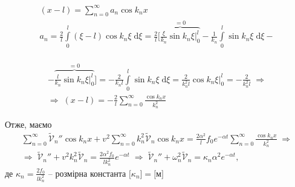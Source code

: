 \begin{equation*}
    \begin{gathered}
        (x-l) = \sum_{n=0}^\infty a_n \cos k_n x\\
        a_n = \frac{2}{l} \int\limits_0^l (\xi-l) \cos k_n\xi \;\mathrm{d}\xi =\frac{2}{l} \bigg[ \overbrace{\frac{\xi}{k_n} \sin k_n\xi \bigg|_0^l}^{=0} - \frac{1}{k_n} \int\limits_0^l \sin k_n\xi \;\mathrm{d}\xi -\\
    \end{gathered}
\end{equation*}

\begin{equation} \label{fourier-sum7,1}
    \begin{gathered}
        -\overbrace{\frac{l}{k_n}\sin k_n\xi \bigg|_0^l}^{=0}\bigg] = -\frac{2}{k_n l} \int\limits_0^l \sin k_n\xi \;\mathrm{d}\xi = \frac{2}{k_n^2 l} \cos k_n\xi \bigg|_0^l = -\frac{2}{k_n^2 l} 
        \;\Rightarrow \\
        \Rightarrow\; (x-l) = -\frac{2}{l}\sum_{n=0}^\infty \frac{\cos k_n x}{k_n^2}
    \end{gathered}
\end{equation}

Отже, маємо 
\begin{equation}
    \begin{gathered}
        \sum_{n=0}^\infty \widetilde{\mathcal{V}}_n'' \cos k_n x + v^2 \sum_{n=0}^\infty k_n^2 \widetilde{\mathcal{V}}_n \cos k_n x =  \frac{2 \alpha^2}{l} f_0 e^{-\alpha t} \sum_{n=0}^\infty \frac{\cos k_n x}{k_n^2} 
        \;\Rightarrow\\
        \Rightarrow\; 
        \widetilde{\mathcal{V}}_n'' + v^2 k_n^2 \widetilde{\mathcal{V}}_n = \frac{2\alpha^2f_0}{l k_n^2} e^{-\alpha t} 
        \;\Rightarrow\;
        \widetilde{\mathcal{V}}_n'' + \omega_n^2 \widetilde{\mathcal{V}}_n = \kappa_n\alpha^2 e^{-\alpha t}, 
    \end{gathered}
\end{equation}
де $\kappa_n = \frac{2f_0}{l k_n^2}$ -- розмірна константа $\big[\kappa_n\big] = \big[\text{м}\big]$


